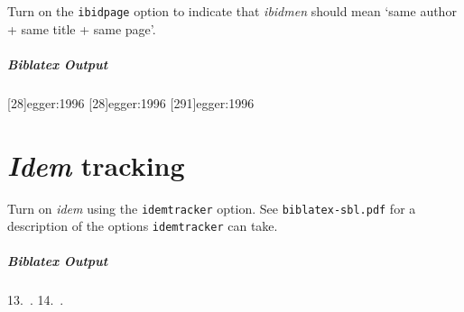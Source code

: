 \documentclass{article}
\newenvironment{biboutput}{%
  \subparagraph{Biblatex Output}
}{\color{black}}
\begin{document}
Turn on the \texttt{ibidpage} option to indicate that \emph{ibidmen} should
mean ‘same author + same title + same page’.

\makeatletter
\let\blx@imc@ifloccit\blx@ifloccit@global
\let\blx@loccittracker\blx@loccittracker@global
\let\blx@loccitreset\blx@loccitreset@global
\makeatother

\begin{biboutput}
  [28]{egger:1996}
  [28]{egger:1996}
  [291]{egger:1996}
\end{biboutput}

\section*{\emph{Idem} tracking}

Turn on \emph{idem} using the \texttt{idemtracker} option. See
\texttt{biblatex-sbl.pdf} for a description of the options
\texttt{idemtracker} can take.

\begin{biboutput}
  \makeatletter\blx@opt@idemtracker@constrict\makeatother
  \color{biblatex-colour}
  \hspace*{\bibindent}13.~\cites[35]{vanseters:1997}{vanseters:1995}.
  \color{black}
  \makeatletter\blx@idemreset\makeatother
  \color{biblatex-colour}
  \hspace*{\bibindent}14.~\cites[35]{vanseters:1997}[222]{vanseters:1995}.
  \color{black}
\end{biboutput}


\printbibliography

\printindex
\end{document}

